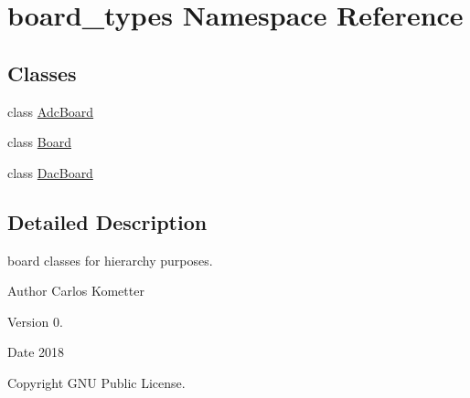 \hypertarget{namespaceboard__types}{}\section{board\+\_\+types Namespace Reference}
\label{namespaceboard__types}
\subsection*{Classes}
\begin{DoxyCompactItemize}
\item 
class \mbox{\hyperlink{classboard__types_1_1AdcBoard}{Adc\+Board}}
\item 
class \mbox{\hyperlink{classboard__types_1_1Board}{Board}}
\item 
class \mbox{\hyperlink{classboard__types_1_1DacBoard}{Dac\+Board}}
\end{DoxyCompactItemize}


\subsection{Detailed Description}
board classes for hierarchy purposes. \begin{DoxyAuthor}{Author}
Carlos Kometter 
\end{DoxyAuthor}
\begin{DoxyVersion}{Version}
0. 
\end{DoxyVersion}
\begin{DoxyDate}{Date}
2018 
\end{DoxyDate}
\begin{DoxyCopyright}{Copyright}
G\+NU Public License. 
\end{DoxyCopyright}
